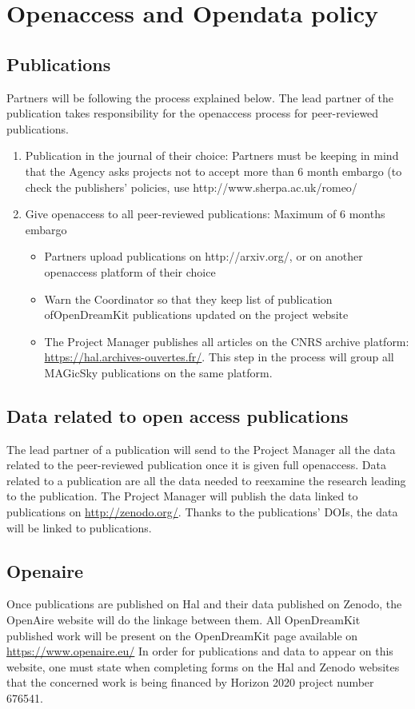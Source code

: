 \documentclass[12pt]{article}
\begin{document}
\section{Openaccess and Opendata policy}
\subsection{Publications}
Partners will be following the process explained below. The lead partner of the publication takes responsibility for the openaccess process for peer-reviewed publications.
\begin{enumerate}
\item{Publication in the journal of their choice:} Partners must be keeping in mind that the Agency asks projects not to accept more than 6 month embargo (to check the publishers’ policies, use http://www.sherpa.ac.uk/romeo/
\item{Give openaccess to all peer-reviewed publications:} Maximum of 6 months embargo
\begin{itemize}
\item{Partners upload publications on http://arxiv.org/, or on another openaccess platform of their choice}
\item{Warn the Coordinator so that they keep list of publication ofOpenDreamKit publications updated on the project website}
\item{The Project Manager publishes all articles on the CNRS archive platform: \href{https://hal.archives-ouvertes.fr/}{https://hal.archives-ouvertes.fr/}.} This step in the process will group all MAGicSky publications on the same platform.
\end{itemize}
\end{enumerate}
\subsection{Data related to open access publications}
The lead partner of a publication will send to the Project Manager all the data related to the peer-reviewed publication once it is given full openaccess. Data related to a publication are all the data needed to reexamine the research leading to the publication.
The Project Manager will publish the data linked to publications on \href{http://zenodo.org/}{http://zenodo.org/}. Thanks to the publications’ DOIs, the data will be linked to publications.

\subsection{Openaire}
Once publications are published on Hal and their data published on Zenodo, the OpenAire website will do the linkage between them. All OpenDreamKit published work will be present on the OpenDreamKit page available on \href{https://www.openaire.eu/}{https://www.openaire.eu/}
In order for publications and data to appear on this website, one must state when completing forms on the Hal and Zenodo websites that the concerned work is being financed by Horizon 2020 project number 676541.
\end{document}
